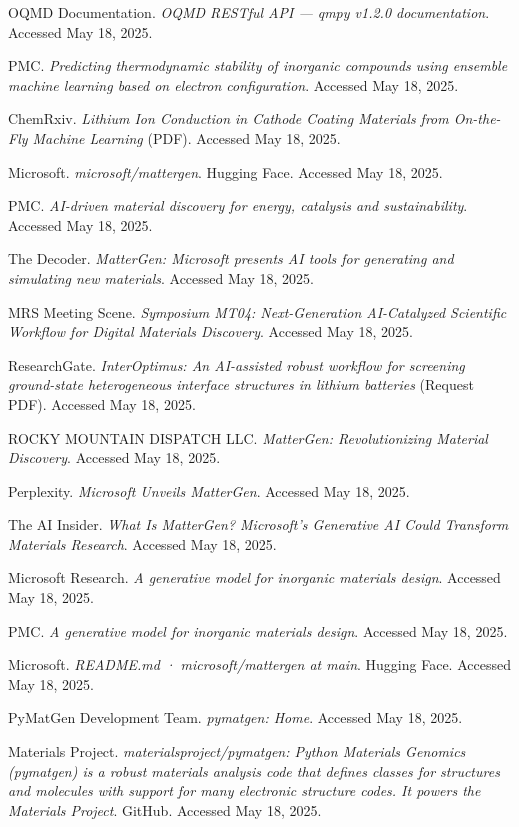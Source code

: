 \documentclass[letterpaper]{article} %
\begin{document}
\begin{thebibliography}{99}
 OQMD Documentation. \textit{OQMD RESTful API — qmpy v1.2.0 documentation}. Accessed May 18, 2025.

 PMC. \textit{Predicting thermodynamic stability of inorganic compounds using ensemble machine learning based on electron configuration}. Accessed May 18, 2025.

 ChemRxiv. \textit{Lithium Ion Conduction in Cathode Coating Materials from On-the-Fly Machine Learning} (PDF). Accessed May 18, 2025.

 Microsoft. \textit{microsoft/mattergen}. Hugging Face. Accessed May 18, 2025.

 PMC. \textit{AI-driven material discovery for energy, catalysis and sustainability}. Accessed May 18, 2025.

 The Decoder. \textit{MatterGen: Microsoft presents AI tools for generating and simulating new materials}. Accessed May 18, 2025.

 MRS Meeting Scene. \textit{Symposium MT04: Next-Generation AI-Catalyzed Scientific Workflow for Digital Materials Discovery}. Accessed May 18, 2025.

 ResearchGate. \textit{InterOptimus: An AI-assisted robust workflow for screening ground-state heterogeneous interface structures in lithium batteries} (Request PDF). Accessed May 18, 2025.

 ROCKY MOUNTAIN DISPATCH LLC. \textit{MatterGen: Revolutionizing Material Discovery}. Accessed May 18, 2025.

 Perplexity. \textit{Microsoft Unveils MatterGen}. Accessed May 18, 2025.

 The AI Insider. \textit{What Is MatterGen? Microsoft's Generative AI Could Transform Materials Research}. Accessed May 18, 2025.

 Microsoft Research. \textit{A generative model for inorganic materials design}. Accessed May 18, 2025.

 PMC. \textit{A generative model for inorganic materials design}. Accessed May 18, 2025.

 Microsoft. \textit{README.md · microsoft/mattergen at main}. Hugging Face. Accessed May 18, 2025.

 PyMatGen Development Team. \textit{pymatgen: Home}. Accessed May 18, 2025.

 Materials Project. \textit{materialsproject/pymatgen: Python Materials Genomics (pymatgen) is a robust materials analysis code that defines classes for structures and molecules with support for many electronic structure codes. It powers the Materials Project}. GitHub. Accessed May 18, 2025.


\end{thebibliography}
\end{document}
